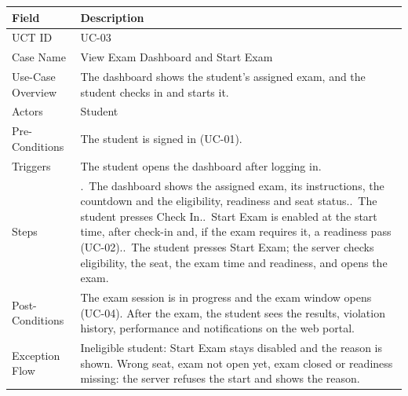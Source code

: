 \begin{lrbox}{\uctbox}{\small\renewcommand{\arraystretch}{1.1}\setlength{\tabcolsep}{6pt}%
\begin{tabular}{>{\raggedright\arraybackslash}p{3.6cm}>{\raggedright\arraybackslash}p{\dimexpr\textwidth-3.6cm-4\tabcolsep\relax}}
\hline\hline
\textbf{Field} & \textbf{Description} \\ \hline
UCT ID & UC-03 \\
Case Name & View Exam Dashboard and Start Exam \\
Use-Case Overview & The dashboard shows the student's assigned exam, and the student checks in and starts it. \\
Actors & Student \\
Pre-Conditions & The student is signed in (UC-01). \\
Triggers & The student opens the dashboard after logging in. \\
Steps & 1.~The dashboard shows the assigned exam, its instructions, the countdown and the eligibility, readiness and seat status.\newline
2.~The student presses Check In.\newline
3.~Start Exam is enabled at the start time, after check-in and, if the exam requires it, a readiness pass (UC-02).\newline
4.~The student presses Start Exam; the server checks eligibility, the seat, the exam time and readiness, and opens the exam. \\
Post-Conditions & The exam session is in progress and the exam window opens (UC-04). After the exam, the student sees the results, violation history, performance and notifications on the web portal. \\
Exception Flow & Ineligible student: Start Exam stays disabled and the reason is shown. Wrong seat, exam not open yet, exam closed or readiness missing: the server refuses the start and shows the reason. \\
\hline\hline
\end{tabular}}\end{lrbox}
\begin{table}[H]
\centering
\caption{Use Case Table for View Exam Dashboard and Start Exam}\label{tab:uc03}
\vspace{4pt}
\usebox{\uctbox}
\end{table}

